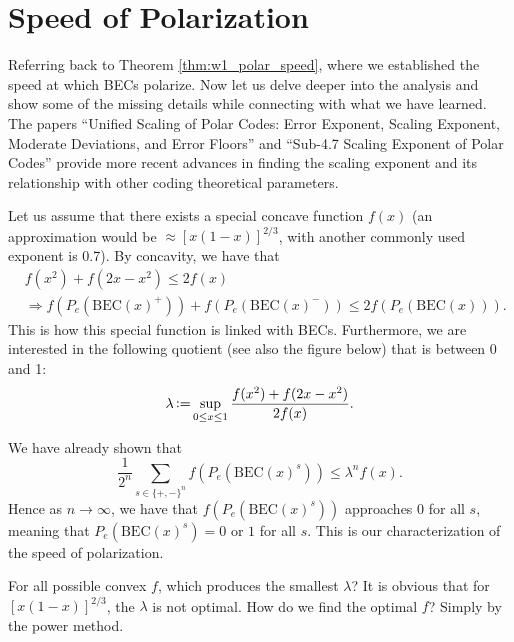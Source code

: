 \section{Speed of Polarization}

Referring back to Theorem \ref{thm:w1_polar_speed}, where we established the speed at which BECs polarize. Now let us delve deeper into the analysis and show some of the missing details while connecting with what we have learned. The papers ``Unified Scaling of Polar Codes: Error Exponent, Scaling Exponent, Moderate Deviations, and Error Floors'' \cite{Unified_Scaling_of_Polar_Codes} and ``Sub-4.7 Scaling Exponent of Polar Codes'' \cite{Sub_4_7_Scaling_Exponent} provide more recent advances in finding the scaling exponent and its relationship with other coding theoretical parameters.

Let us assume that there exists a special concave function $f(x)$ (an approximation would be $\approx[x(1-x)]^{2/3}$, with another commonly used exponent is 0.7). By concavity, we have that
\begin{align*}
    &f(x^2) + f(2x-x^2) \le 2f(x) \\&\Rightarrow f\left(P_e(\mathrm{BEC}(x)^+)\right) + f\left(P_e(\mathrm{BEC}(x)^-)\right) \le 2 f\left(P_e(\mathrm{BEC}(x))\right).
\end{align*}
This is how this special function is linked with BECs. Furthermore, we are interested in the following quotient (see also the figure below) that is between 0 and 1:
\begin{equation}
    \lambda \operatorname{\vcentcolon=} \sup_{0\le x\le 1} \frac{f(x^2) + f(2x-x^2)}{2f(x)}. \label{eq:w6_polarization_lambda}
\end{equation}

We have already shown that
\begin{equation}
    \frac{1}{2^n}\sum_{s\in\{+,-\}^n}f\left(P_e(\mathrm{BEC}(x)^s)\right) \le \lambda^n f(x).
\end{equation}
Hence as $n\rightarrow\infty$, we have that $f\left(P_e(\mathrm{BEC}(x)^s)\right)$ approaches 0 for all $s$, meaning that $P_e(\mathrm{BEC}(x)^s)=0$ or $1$ for all $s$. This is our characterization of the speed of polarization. 

For all possible convex $f$, which produces the smallest $\lambda$? It is obvious that for $[x(1-x)]^{2/3}$, the $\lambda$ is not optimal. How do we find the optimal $f$? Simply by the power method.

